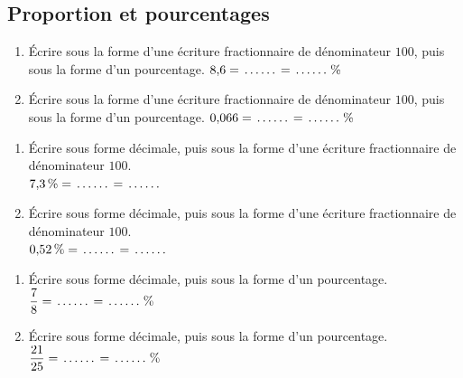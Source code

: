 {\setlength{\columnseprule}{0pt}
\setcounter{NumEx}{1}


\subsection*{Proportion et pourcentages}


\begin{Exercice}
\leavevmode\vspace{-\baselineskip}
\begin{enumerate}
	\item Écrire sous la forme d'une écriture fractionnaire de dénominateur $100$, puis sous la forme d'un pourcentage. $8{,}6=\makebox[.08\linewidth]{\dotfill}=\makebox[.08\linewidth]{\dotfill}\,\%$
	\item Écrire sous la forme d'une écriture fractionnaire de dénominateur $100$, puis sous la forme d'un pourcentage. $0{,}066=\makebox[.08\linewidth]{\dotfill}=\makebox[.08\linewidth]{\dotfill}\,\%$
\end{enumerate}
\end{Exercice}

\begin{Exercice}
\leavevmode\vspace{-\baselineskip}
\begin{enumerate}
	\item Écrire sous forme décimale, puis sous la forme d'une écriture fractionnaire de dénominateur $100$.\\
$7{,}3\,\%=\makebox[.08\linewidth]{\dotfill}=\makebox[.08\linewidth]{\dotfill}$
	\item Écrire sous forme décimale, puis sous la forme d'une écriture fractionnaire de dénominateur $100$.\\
$0{,}52\,\%=\makebox[.08\linewidth]{\dotfill}=\makebox[.08\linewidth]{\dotfill}$\\
\end{enumerate}
\end{Exercice}

\begin{Exercice}
\leavevmode\vspace{-\baselineskip}
\begin{enumerate}
	\item Écrire sous forme décimale, puis sous la forme d'un pourcentage. $\dfrac{7}{8}=\makebox[.08\linewidth]{\dotfill}=\makebox[.08\linewidth]{\dotfill}\,\%$
	\item Écrire sous forme décimale, puis sous la forme d'un pourcentage. $\dfrac{21}{25}=\makebox[.08\linewidth]{\dotfill}=\makebox[.08\linewidth]{\dotfill}\,\%$
\end{enumerate}
\end{Exercice}



}
